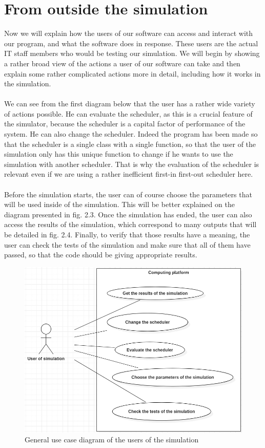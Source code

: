 \documentclass [10 pt, a4 paper]{report}
\begin{document}
\section{From outside the simulation}
Now we will explain how the users of our software can access and interact with our program, and what the software does in response. These users are the actual IT staff members who would be testing our simulation. We will begin by showing a rather broad view of the actions a user of our software can take and then explain some rather complicated actions more in detail, including how it works in the simulation.
\\ \\
We can see from the first diagram below that the user has a rather wide variety of actions possible. He can evaluate the scheduler, as this is a crucial feature of the simulator, because the scheduler is a capital factor of performance of the system. He can also change the scheduler. Indeed the program has been made so that the scheduler is a single class with a single function, so that the user of the simulation only has this unique function to change if he wants to use the simulation with another scheduler. That is why the evaluation of the scheduler is relevant even if we are using a rather inefficient first-in first-out scheduler here. 
\\ \\
Before the simulation starts, the user can of course choose the parameters that will be used inside of the simulation. This will be better explained on the diagram presented in fig. 2.3. Once the simulation has ended, the user can also access the results of the simulation, which correspond to many outputs that will be detailed in fig. 2.4. Finally, to verify that those results have a meaning, the user can check the tests of the simulation and make sure that all of them have passed, so that the code should be giving appropriate results.
\clearpage

\begin{figure}[!htbp]
\centering
\includegraphics[width=\textwidth]{UCD2.jpg}
\caption{\label{fig:image} General use case diagram of the users of the simulation}
\end{figure}
\end{document}
